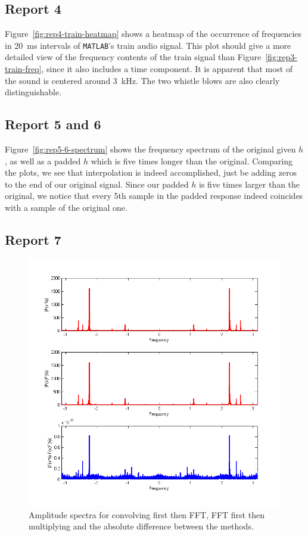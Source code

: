 \documentclass[11pt,titlepage]{report}
\begin{document}
\subsection{Report 4}
Figure~\ref{fig:rep4-train-heatmap} shows a heatmap of the occurrence of frequencies in \SI{20}{\milli\second} intervals of \texttt{MATLAB}'s train audio signal. This plot should give a more detailed view of the frequency contents of the train signal than Figure~\ref{fig:rep3-train-freq}, since it also includes a time component. It is apparent that most of the sound is centered around \SI{3}{\kilo\hertz}. The two whistle blows are also clearly distinguishable.


\subsection{Report 5 and 6}


Figure~\ref{fig:rep5-6-spectrum} shows the frequency spectrum of the original given $h$, as well as a padded $h$ which is five times longer than the original. Comparing the plots, we see that interpolation is indeed accomplished, just be adding zeros to the end of our original signal. Since our padded $h$ is five times larger than the original, we notice that every 5th sample in the padded response indeed coincides with a sample of the original one.

\subsection{Report 7}


\begin{figure}[H]
	\centering
	\includegraphics[width=0.8\linewidth]{resource/rep7.png}
	\caption{Amplitude spectra for convolving first then FFT, FFT first then multiplying and the absolute difference between the methods.}
	\label{fig:rep7}
\end{figure}
\end{document}
